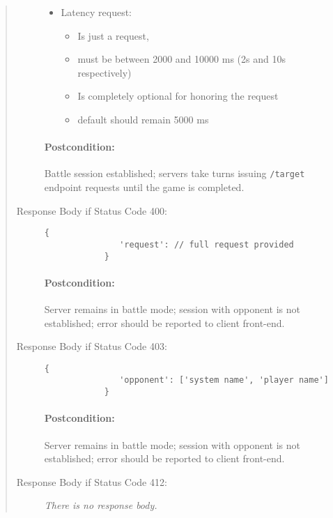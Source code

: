 \documentclass[10pt]{article}
\begin{document}
\begin{quote}
\begin{description}
\begin{itemize}
            \item Latency request:
               \begin{itemize}
                  \item Is just a request,
                  \item must be between 2000 and 10000 ms (2s and 10s respectively)
                  \item Is completely optional for honoring the request
                  \item default should remain 5000 ms
               \end{itemize}
         \end{itemize}

         \paragraph{Postcondition:} Battle session established; servers take turns issuing \verb|/target| endpoint requests until the game is completed.
      
      \item[Response Body if Status Code 400:]
         \begin{lstlisting}[gobble=12]
            {
               'request': // full request provided
            }
         \end{lstlisting}

         \paragraph{Postcondition:} Server remains in battle mode; session with opponent is not established; error should be reported to client front-end.

      \item[Response Body if Status Code 403:]
         \begin{lstlisting}[gobble=12]
            {
               'opponent': ['system name', 'player name']
            }
         \end{lstlisting}

         \paragraph{Postcondition:} Server remains in battle mode; session with opponent is not established; error should be reported to client front-end.

      \item[Response Body if Status Code 412:] \emph{There is no response body.}
      

\end{description}
\end{quote}
\end{document}
